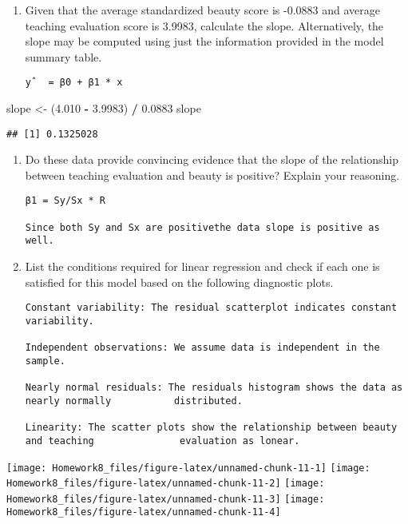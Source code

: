\documentclass[]{article}
\newenvironment{Shaded}{\begin{snugshade}}{\end{snugshade}}
\newcommand{\FloatTok}[1]{\textcolor[rgb]{0.00,0.00,0.81}{#1}}
\newcommand{\StringTok}[1]{\textcolor[rgb]{0.31,0.60,0.02}{#1}}
\newcommand{\OperatorTok}[1]{\textcolor[rgb]{0.81,0.36,0.00}{\textbf{#1}}}
\newcommand{\NormalTok}[1]{#1}
\begin{document}
\begin{enumerate}
\def\labelenumi{(\alph{enumi})}
\item
  Given that the average standardized beauty score is -0.0883 and
  average teaching evaluation score is 3.9983, calculate the slope.
  Alternatively, the slope may be computed using just the information
  provided in the model summary table.

\begin{verbatim}
yˆ  = β0 + β1 * x
\end{verbatim}
\end{enumerate}

\begin{Shaded}
\begin{Highlighting}[]
\NormalTok{slope <-}\StringTok{ }\NormalTok{(}\FloatTok{4.010} \OperatorTok{-}\StringTok{ }\FloatTok{3.9983}\NormalTok{) }\OperatorTok{/}\StringTok{ }\FloatTok{0.0883}
\NormalTok{slope}
\end{Highlighting}
\end{Shaded}

\begin{verbatim}
## [1] 0.1325028
\end{verbatim}

\begin{enumerate}
\def\labelenumi{(\alph{enumi})}
\setcounter{enumi}{1}
\item
  Do these data provide convincing evidence that the slope of the
  relationship between teaching evaluation and beauty is positive?
  Explain your reasoning.

\begin{verbatim}
β1 = Sy/Sx * R

Since both Sy and Sx are positivethe data slope is positive as well.
\end{verbatim}
\item
  List the conditions required for linear regression and check if each
  one is satisfied for this model based on the following diagnostic
  plots.

\begin{verbatim}
Constant variability: The residual scatterplot indicates constant variability.

Independent observations: We assume data is independent in the sample.

Nearly normal residuals: The residuals histogram shows the data as nearly normally           distributed.

Linearity: The scatter plots show the relationship between beauty and teaching               evaluation as lonear.
\end{verbatim}
\end{enumerate}

\texttt{[image: Homework8\_files/figure-latex/unnamed-chunk-11-1]}
\texttt{[image: Homework8\_files/figure-latex/unnamed-chunk-11-2]}
\texttt{[image: Homework8\_files/figure-latex/unnamed-chunk-11-3]}
\texttt{[image: Homework8\_files/figure-latex/unnamed-chunk-11-4]}
\end{document}
